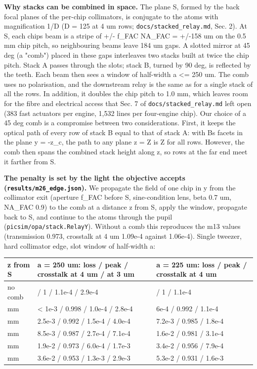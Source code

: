 \textbf{Why stacks can be combined in space.} The plane S, formed by the
back focal planes of the per-chip collimators, is conjugate to the atoms
with magnification 1/D (D = 125 at 4 um rows;
\texttt{docs/stacked\_relay.md}, Sec. 2). At S, each
chip\textquotesingle s beam is a stripe of +/- f\_FAC NA\_FAC = +/-158
um on the 0.5 mm chip pitch, so neighbouring beams leave 184 um gaps. A
slotted mirror at 45 deg (a "comb") placed in these gaps interleaves two
stacks built at twice the chip pitch. Stack A passes through the slots;
stack B, turned by 90 deg, is reflected by the teeth. Each beam then
sees a window of half-width a \textless= 250 um. The comb uses no
polarisation, and the downstream relay is the same as for a single stack
of all the rows. In addition, it doubles the chip pitch to 1.0 mm, which
leaves room for the fibre and electrical access that Sec. 7 of
\texttt{docs/stacked\_relay.md} left open (383 fast actuators per
engine, 1,532 lines per four-engine chip). Our choice of a 45 deg comb
is a compromise between two considerations. First, it keeps the optical
path of every row of stack B equal to that of stack A: with
B\textquotesingle s facets in the plane y = -z\_c, the path to any plane
z = Z is Z for all rows. However, the comb then spans the combined stack
height along z, so rows at the far end meet it farther from S.

\textbf{The penalty is set by the light the objective accepts
(\texttt{results/m26\_edge.json}).} We propagate the field of one chip
in y from the collimator exit (aperture f\_FAC before S, sine-condition
lens, beta 0.7 um, NA\_FAC 0.9) to the comb at a distance z from S,
apply the window, propagate back to S, and continue to the atoms through
the pupil (\texttt{picsim/opa/stack.RelayY}). Without a comb this
reproduces the m13 values (transmission 0.973, crosstalk at 4 um 1.09e-4
against 1.06e-4). Single tweezer, hard collimator edge, slot window of
half-width a:

{\small
\begin{longtable}[]{@{}>{\raggedright\arraybackslash}p{0.103\dimexpr(\linewidth-6\tabcolsep)\relax}>{\raggedright\arraybackslash}p{0.495\dimexpr(\linewidth-6\tabcolsep)\relax}>{\raggedright\arraybackslash}p{0.402\dimexpr(\linewidth-6\tabcolsep)\relax}@{}}
\toprule\noalign{}
z from S & a = 250 um: loss / peak / crosstalk at 4 um / at 3 um & a =
225 um: loss / peak / crosstalk at 4 um \\
\midrule\noalign{}
\endhead
\bottomrule\noalign{}
\endlastfoot
no comb & 0 / 1 / 1.1e-4 / 2.9e-4 & 0 / 1 / 1.1e-4 \\
10 mm & \textless{} 1e-3 / 0.998 / 1.0e-4 / 2.8e-4 & 6e-4 / 0.992 /
1.1e-4 \\
20 mm & 2.5e-3 / 0.992 / 1.5e-4 / 4.0e-4 & 7.2e-3 / 0.985 / 1.8e-4 \\
30 mm & 8.5e-3 / 0.987 / 2.7e-4 / 7.1e-4 & 1.6e-2 / 0.981 / 3.1e-4 \\
45 mm & 1.9e-2 / 0.973 / 6.0e-4 / 1.7e-3 & 3.4e-2 / 0.956 / 7.9e-4 \\
60 mm & 3.6e-2 / 0.953 / 1.3e-3 / 2.9e-3 & 5.3e-2 / 0.931 / 1.6e-3 \\
\end{longtable}
}


